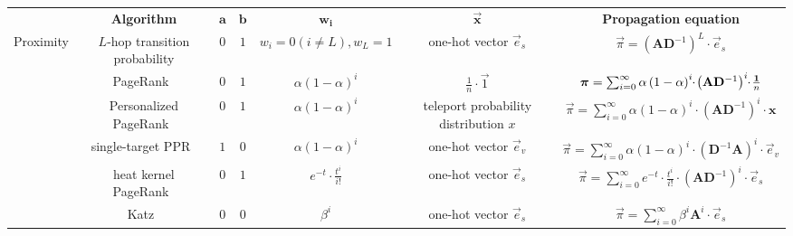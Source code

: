 \begin{table*}[t]
\begin{small}
\begin{tabular}{|c|c|c|c|c|c|c|}
					~&{\bf Algorithm} & {\bf $\boldsymbol{a}$}& {\bf $\boldsymbol{b}$} & {\bf $\boldsymbol{w_i}$} & {\bf $\boldsymbol{\vec{x}}$} & {\bf Propagation equation} \\ \cline{1-7}
			\multirow{6}{*}{Proximity} &	{$L$-hop transition probability} & $0$ & $1$ & $w_i=0 (i \neq L), w_L=1$ & one-hot vector $\vec{e}_s$ & $\vec{\pi}=\left(\mathbf{A} \mathbf{D}^{-1} \right)^L \cdot \vec{e}_s $\\ \cline{2-7}
			~&{PageRank}~\cite{page1999pagerank} & $0$ & $1$& $\alpha \left( 1-\alpha \right)^i $ & $\frac{1}{n}\cdot \vec{1}$ & $\vec{\pi}=\sum_{i=0}^\infty \alpha \left( 1-\alpha \right)^i \hspace{-1mm}\cdot\hspace{-0.5mm} \left(\mathbf{A} \mathbf{D}^{-1} \right)^i \hspace{-1mm}\cdot \hspace{-0.5mm} \frac{\vec{1}}{n}$ \\ \cline{2-7}
			~&{Personalized PageRank}~\cite{page1999pagerank} &$0$ & $1$ & $\alpha \left( 1-\alpha \right)^i $ & teleport probability distribution $x$ & $\vec{\pi}=\sum_{i=0}^\infty \alpha \left( 1-\alpha \right)^i \cdot \left(\mathbf{A} \mathbf{D}^{-1} \right)^i \cdot \bm{x} $ \\ \cline{2-7}
			~&{single-target PPR}~\cite{lofgren2013personalized} & $1$ & $0$ & $\alpha \left( 1-\alpha \right)^i $ & one-hot vector $\vec{e}_v$ & $\vec{\pi}=\sum_{i=0}^\infty \alpha \left( 1-\alpha \right)^i \cdot \left(\mathbf{D}^{-1} \mathbf{A} \right)^i \cdot \vec{e}_v $\\ \cline{2-7}
			~&{heat kernel PageRank}~\cite{chung2007HKPR}  &$0$ & $1$ & $e^{-t} \cdot \frac{t^i}{i!} $ & one-hot vector $\vec{e}_s$ & $\vec{\pi}=\sum_{i=0}^\infty e^{-t} \cdot \frac{t^i}{i!}\cdot \left(\mathbf{A} \mathbf{D}^{-1} \right)^i \cdot \vec{e}_s $\\ \cline{2-7}
			~&{Katz}~\cite{katz1953Katz} & $0$ & $0$ & $\beta^i$ & one-hot vector $\vec{e}_s$ & $\vec{\pi}=\sum_{i=0}^\infty \beta^i  \mathbf{A}^i \cdot \vec{e}_s$\\ \hline
			

\end{tabular}
\end{small}
\end{table*}
